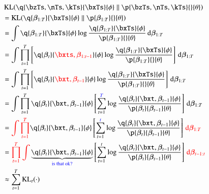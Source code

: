 \begin{equation}
\begin{aligned}
    &\kl{\q{\bzTs, \nTs, \kTs}{\bxTs}{\phi}}{\p{\bzTs, \nTs, \kTs}{}{\theta}}\\
    &= \kl{\q{\bm{\beta}_{1:T}}{\bxTs}{\phi}}{\p{\bm{\beta}_{1:T}}{}{\theta}}\\
%    
    &= \int \q{\bm{\beta}_{1:T}}{\bxTs}{\phi} \log{\frac{\q{\bm{\beta}_{1:T}}{\bxTs}{\phi}}{\p{\bm{\beta}_{1:T}}{}{\theta}}} \dint \bm{\beta}_{1:T}\\
%    
    &= \int \prod_{t=1}^T \left[ \q{\bm{\beta}_t}{\textcolor{red}{\bxts, \bm{\beta}_{1:t-1}}}{\phi} \log{\frac{\q{\bm{\beta}_{1:T}}{\bxTs}{\phi}}{\p{\bm{\beta}_{1:T}}{}{\theta}}} \right] \dint \bm{\beta}_{1:T} \\
%    
    &= \int \prod_{t=1}^T \left[ \q{\bm{\beta}_t}{\textcolor{red}{\bxt, \bm{\beta}_{t-1}}}{\phi} \log{\frac{\q{\bm{\beta}_{1:T}}{\bxTs}{\phi}}{\p{\bm{\beta}_{1:T}}{}{\theta}}} \right] \dint \bm{\beta}_{1:T}\\
%    
    &= \int \prod_{t=1}^T \q{\bm{\beta}_t}{\bxt, \bm{\beta}_{t-1}}{\phi} \left[ \sum_{t=1}^{\textcolor{blue}{T}} \log{\frac{ \q{\bm{\beta}_t}{\bxt, \bm{\beta}_{t-1}}{\phi} }{ \p{\bm{\beta}_t}{\bm{\beta}_{t-1} }{\theta}}} \right] \dint \bm{\beta}_{1:T}\\
%    
    &= \textcolor{red}{\int \prod_{t=1}^T} \q{\bm{\beta}_t}{\bxt, \bm{\beta}_{t-1}}{\phi} \left[ \sum_{t=1}^{\textcolor{blue}{t}} \log{\frac{ \q{\bm{\beta}_t}{\bxt, \bm{\beta}_{t-1}}{\phi} }{ \p{\bm{\beta}_t}{\bm{\beta}_{t-1} }{\theta}}} \right] \textcolor{red}{\dint \bm{\beta}_{1:T}}\\
%    
    &= \textcolor{red}{\prod_{t=1}^T \int} \underbrace{ \q{\bm{\beta}_t}{\bxt, \bm{\beta}_{t-1}}{\phi} }_{\textcolor{blue}{\text{is that ok?}}} \left[ \sum_{t=1}^t \log{\frac{ \q{\bm{\beta}_t}{\bxt, \bm{\beta}_{t-1}}{\phi} }{ \p{\bm{\beta}_t}{\bm{\beta}_{t-1} }{\theta}}} \right] \textcolor{red}{\dint \bm{\beta}_{t-1:t} }\\
%    
    &\approx \sum_{t=1}^T \operatorname{KL}_t(\cdot)
\end{aligned}
\end{equation}

